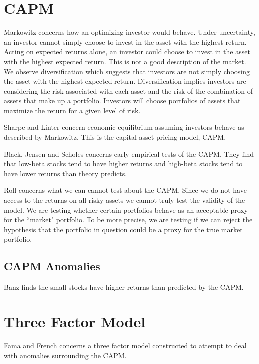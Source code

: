 \section{CAPM}

Markowitz\cite{markowitz1959portfolio} concerns how an optimizing investor
would behave. Under uncertainty, an investor cannot simply choose to invest in
the asset with the highest return. Acting on expected returns alone, an
investor could choose to invest in the asset with the highest expected return.
This is not a good description of the market. We observe diversification which
suggests that investors are not simply choosing the asset with the highest
expected return. Diversification implies investors are considering the risk
associated with each asset and the risk of the combination of assets that make
up a portfolio. Investors will choose portfolios of assets that maximize the
return for a given level of risk.

Sharpe\cite{sharpe1964capital} and Linter\cite{lintner1965valuation} concern
economic equilibrium assuming investors behave as described by Markowitz. This
is the capital asset pricing model, CAPM.

Black, Jensen and Scholes\cite{jensen1972capital} concerns early empirical
tests of the CAPM. They find that low-beta stocks tend to have higher returns
and high-beta stocks tend to have lower returns than theory predicts.

Roll\cite{roll1977critique} concerns what we can cannot test about the CAPM.
Since we do not have access to the returns on all risky assets we cannot truly
test the validity of the model. We are testing whether certain portfolios
behave as an acceptable proxy for the ``market" portfolio. To be more precise,
we are testing if we can reject the hypothesis that the portfolio in question
could be a proxy for the true market portfolio.

\subsection{CAPM Anomalies}

Banz\cite{banz1981relationship} finds the small stocks have higher returns
than predicted by the CAPM.

\section{Three Factor Model}

Fama and French\cite{fama1993common} concerns a three factor model constructed
to attempt to deal with anomalies surrounding the CAPM.

